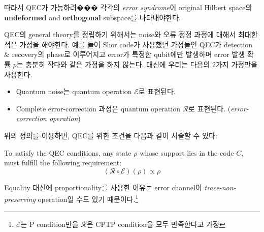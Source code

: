 따라서 QEC가 가능하려��� 각각의 \textit{error syndrome}이 original Hilbert space의 \textbf{undeformed} and \textbf{orthogonal} subspace를 나타내야한다.

\vspace{1em}

QEC의 general theory를 정립하기 위해서는 noise와 오류 정정 과정에 대해서 최대한 적은 가정을 해야한다. 예를 들어 Shor code가 사용했던 가정들인 QEC가 detection \& recovery의 phase로 이루어지고 error가 특정한 qubit에만 발생하며 error 발생 확률 $p$는 충분히 작다와 같은 가정을 하지 않는다.
대신에 우리는 다음의 2가지 가정만을 사용한다.
\begin{itemize}
    \item Quantum noise는 quantum operation $\mathcal E$로 표현된다.
    \item Complete error-correction 과정은 quantum operation $\mathcal R$로 표현된다. (\textit{error-correction operation})
\end{itemize}

위의 정의를 이용하면, QEC를 위한 조건을 다음과 같이 서술할 수 있다:
\begin{note}
    To satisfy the QEC conditions, any state $\rho$ whose support lies in the code $C$, must fulfill the following requirement:
    \begin{equation*}
        (\mathcal{R} \circ \mathcal{E})(\rho) \propto \rho
    \end{equation*}
\end{note}

Equality 대신에 proportionality를 사용한 이유는 error channel이 \textit{trace-non-preserving} operation일 수도 있기 때문이다.\footnote{$\mathcal E$는 P condition만을 $\mathcal R$은 CPTP condition을 모두 만족한다고 가정}

